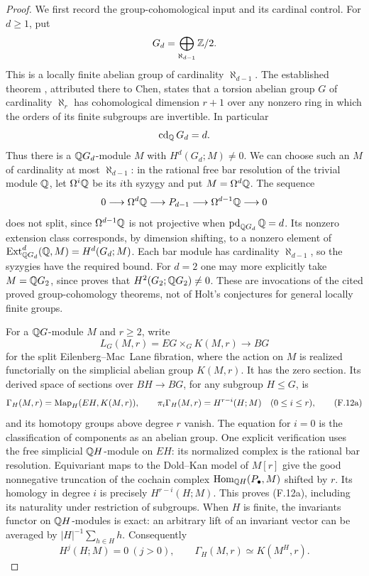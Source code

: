 \begin{proof}
We first record the group-cohomological input and its cardinal control.
For $d\geq1$, put
\[
 G_d=\bigoplus_{\aleph_{d-1}}\mathbb Z/2.
\]
This is a locally finite abelian group of cardinality $\aleph_{d-1}$.
The established theorem
\citet[Corollary~6.10(2)]{BC_DKLT2002}, attributed there to Chen,
states that a torsion abelian group $G$ of cardinality $\aleph_r$
has cohomological dimension $r+1$ over any nonzero ring in which
the orders of its finite subgroups are invertible. In particular
\[
       \operatorname{cd}_{\mathbb Q}G_d=d.
\]
Thus there is a $\mathbb Q G_d$-module $M$ with
$H^d(G_d;M)\ne0$. We can choose such an $M$ of cardinality at
most $\aleph_{d-1}$: in the rational free bar resolution of the
trivial module $\mathbb Q$, let $\Omega^i\mathbb Q$ be its $i$th syzygy and
put $M=\Omega^d\mathbb Q$. The sequence
\[
 0\longrightarrow\Omega^d\mathbb Q\longrightarrow P_{d-1}
   \longrightarrow\Omega^{d-1}\mathbb Q\longrightarrow0
\]
does not split, since $\Omega^{d-1}\mathbb Q$ is not projective when
$\operatorname{pd}_{\mathbb Q G_d}\mathbb Q=d$. Its nonzero extension class
corresponds, by dimension shifting, to a nonzero element of
$\operatorname{Ext}^d_{\mathbb Q G_d}(\mathbb Q,M)=H^d(G_d;M)$.
Each bar module has cardinality $\aleph_{d-1}$, so the syzygies
have the required bound. For $d=2$ one may more explicitly take
$M=\mathbb Q G_2$, since \citet[Theorem~5.4]{BC_DKLT2002} proves that
$H^2(G_2;\mathbb Q G_2)\ne0$. These are invocations of the cited proved
group-cohomology theorems, not of Holt's conjectures for general
locally finite groups.

For a $\mathbb Q G$-module $M$ and $r\geq2$, write
\[
 L_G(M,r)=EG\times_G K(M,r)\longrightarrow BG
\]
for the split Eilenberg--Mac~Lane fibration, where the action on
$M$ is realized functorially on the simplicial abelian group
$K(M,r)$. It has the zero section. Its derived space of sections
over $BH\to BG$, for any subgroup $H\leq G$, is
\[
 \Gamma_H(M,r)=\operatorname{Map}_H(EH,K(M,r)),\qquad
 \pi_i\Gamma_H(M,r)=H^{r-i}(H;M)\quad(0\leq i\leq r),
 \tag{F.12a}
\]
and its homotopy groups above degree $r$ vanish. The equation for
$i=0$ is the classification of components as an abelian group.
One explicit verification uses the free simplicial $\mathbb Q H$-module
on $EH$: its normalized complex is the rational bar resolution.
Equivariant maps to the Dold--Kan model of $M[r]$ give the good
nonnegative truncation of the cochain complex
$\operatorname{Hom}_{\mathbb Q H}(P_\bullet,M)$ shifted by $r$. Its homology in
degree $i$ is precisely $H^{r-i}(H;M)$. This proves (F.12a),
including its naturality under restriction of subgroups.
When $H$ is finite, the invariants functor on $\mathbb Q H$-modules is
exact: an arbitrary lift of an invariant vector can be averaged
by $|H|^{-1}\sum_{h\in H}h$. Consequently
\[
 H^j(H;M)=0\ (j>0),\qquad
       \Gamma_H(M,r)\simeq K(M^H,r).
 \tag{F.12b}
\]


\end{proof}
